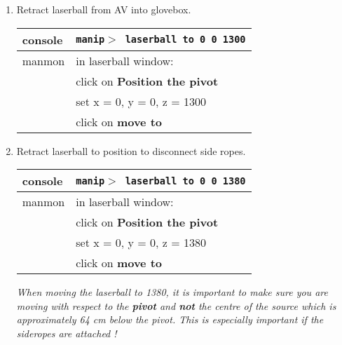 \begin{enumerate}
\item\checkbox Retract laserball from AV into glovebox.
  \begin{center}
  \begin{tabular}{|l|l|}
  \hline
  console & {\tt manip$>$ laserball to 0 0 1300} \\
  \hline
  manmon  & in laserball window: \\
          & click on {\bf Position the pivot}\\
          & set x = 0, y = 0, z = 1300\\
          & click on {\bf move to} \\
  \hline
  \end{tabular}
  \end{center}
\item\checkbox Retract laserball to position to disconnect side ropes.
  \begin{center}
  \begin{tabular}{|l|l|}
  \hline
  console & {\tt manip$>$ laserball to 0 0 1380} \\
  \hline
  manmon  & in laserball window: \\
          & click on {\bf Position the pivot}\\
          & set x = 0, y = 0, z = 1380\\
          & click on {\bf move to} \\
  \hline
  \end{tabular}
  \end{center}
  \small
  {\em
    When moving the laserball to 1380, it is important to make sure
    you are moving with respect to the { \bf pivot } and  { \bf not } the
   centre of the source which is
    approximately 64 cm  below the pivot.  This is especially important if the sideropes
are attached ! 

  }
  \normalsize

  



\end{enumerate}
